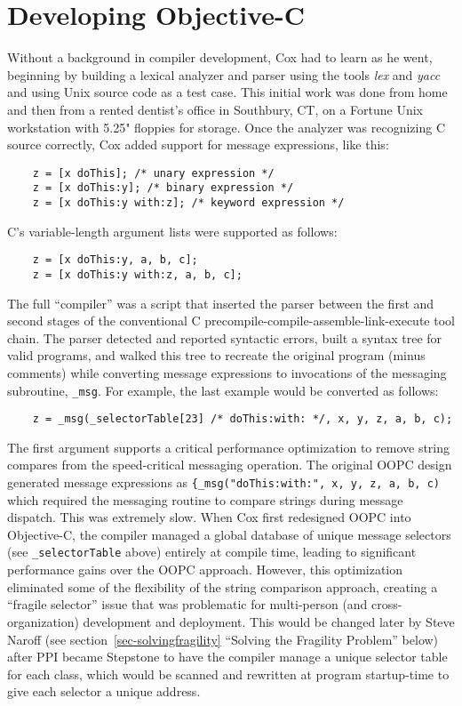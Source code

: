 \documentclass[acmsmall,screen]{acmart}
\begin{document}
\section{Developing Objective-C}
\label{sec-devObjC}
Without a background in compiler development, Cox had to learn as he went, beginning by building a lexical analyzer and parser using the tools \textit{lex} and \textit{yacc} and using Unix source code as a test case. This initial work was done from home and then from a rented dentist's office in Southbury, CT, on a Fortune Unix workstation with 5.25" floppies for storage. Once the analyzer was recognizing C source correctly, Cox added support for message expressions, like this:
\begin{verbatim}
    z = [x doThis]; /* unary expression */
    z = [x doThis:y]; /* binary expression */
    z = [x doThis:y with:z]; /* keyword expression */
\end{verbatim}
C's variable-length argument lists were supported as follows:
\begin{verbatim}
    z = [x doThis:y, a, b, c]; 
    z = [x doThis:y with:z, a, b, c];
\end{verbatim}
The full ``compiler'' was a script that inserted the parser between the first and second stages of the conventional C precompile-compile-assemble-link-execute tool chain. The parser detected and reported syntactic errors, built a syntax tree for valid programs, and walked this tree to recreate the original program (minus comments) while converting message expressions to invocations of the messaging subroutine, \verb|_msg|. For example, the last example would be converted as follows:
\begin{verbatim}
    z = _msg(_selectorTable[23] /* doThis:with: */, x, y, z, a, b, c);
\end{verbatim}
The first argument supports a critical performance optimization to remove string compares from the speed-critical messaging operation. The original OOPC design generated message expressions as {\small \verb|{_msg("doThis:with:", x, y, z, a, b, c)|} which required the messaging routine to compare strings during message dispatch. This was extremely slow. When Cox first redesigned OOPC into Objective-C, the compiler managed a global database of unique message selectors (see {\small \verb|_selectorTable|} above) entirely at compile time, leading to significant performance gains over the OOPC approach. However, this optimization eliminated some of the flexibility of the string comparison approach, creating a ``fragile selector'' issue that was problematic for multi-person (and cross-organization) development and deployment. This would be changed later by Steve Naroff (see section~\ref{sec-solvingfragility} ``Solving the Fragility Problem'' below) after PPI became Stepstone to have the compiler manage a unique selector table for each class, which would be scanned and rewritten at program startup-time to give each selector a unique address.
\end{document}
